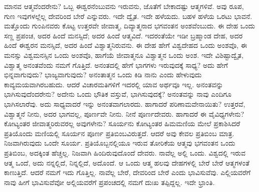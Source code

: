 ಮಾನವ ಆತ್ಮವೆಂದರೇನು? ಒಬ್ಬ ಈಶ್ವರನೆಂಬುವನು ಇರುವನು, ಜೊತೆಗೆ ಬೇಕಾದಷ್ಟು ಆತ್ಮಗಳಿವೆ. ಅವು ರೂಪ, ಗುಣ ಇವುಗಳಲ್ಲೆಲ್ಲ ದೇವರಿಂದ ಬೇರೆ ಎನ್ನುವರು. ಇದೇ ದ್ವೈತ. ಇದೇ ಹಳೆಯದು. ಬಹಳ ಹಳೆಯ ಒರಟು ಭಾವನೆ. ಮತ್ತೊಂದು ಗುಂಪಿನವರು ಕೊಟ್ಟ ಉತ್ತರವೇ ಜೀವಾತ್ಮ, ದಿವ್ಯಾತ್ಮನಾದ ಭಗವಂತನ ಅಂಶವೆಂಬುದು. ಈ ದೇಹ ಒಂದು ಸಣ್ಣ ಪ್ರಪಂಚ, ಅದರ ಹಿಂದೆ ಮನಸ್ಸಿದೆ; ಅದರ ಹಿಂದೆ ಆತ್ಮವಿದೆ. ಇದರಂತೆಯೇ ಇಡೀ ಬ್ರಹ್ಮಾಂಡ ದೇಹ, ಅದರ ಹಿಂದೆ ಈಶ್ವರನ ಮನಸ್ಸಿದೆ, ಅದರ ಹಿಂದೆ ವಿಶ್ವಾತ್ಮನಿರುವನು. ಈ ದೇಹ ಹೇಗೆ ವಿಶ್ವದೇಹದ ಒಂದು ಅಂಶವೊ, ಈ ಮನಸ್ಸು ವಿಶ್ವಮನಸ್ಸಿನ ಒಂದು ಅಂಶವೊ, ಹಾಗೆಯೆ ಜೀವಾತ್ಮನೂ ವಿಶ್ವಾತ್ಮನ ಒಂದು ಅಂಶ. ಇದೇ ವಿಶಿಷ್ಟಾದ್ವೈತ, ವಿಶ್ವಾತ್ಮ ಅನಂತವೆಂದು ನಮಗೆ ಗೊತ್ತಿದೆ. ಅನಂತದಲ್ಲಿ ಹೇಗೆ ಭಾಗಗಳು ಇರುವುದಕ್ಕೆ ಸಾಧ್ಯ? ಅದು ಹೇಗೆ ಭಿನ್ನವಾಗುವುದು? ಭಾಜ್ಯವಾಗುವುದು? ಅನಂತಾತ್ಮನ ಒಂದು ಕಿಡಿ ನಾನು ಎಂದು ಹೇಳುವುದು ಕಾವ್ಯಮಯವಾಗಿರಬಹುದು. ಆದರೆ ವಿಚಾರಮತಿಗಳಿಗೆ ಇದರಲ್ಲಿ ಯಾವ ಅರ್ಥವೂ ಇಲ್ಲ. ಅನಂತವನ್ನು ಭಾಗಿಸುವುದೆಂದರೇನು? ಅದೇನು ಒಂದು ಭೌತಿಕ ವಸ್ತುವೆ, ಭಾಗಿಸುವುದಕ್ಕೆ? ಅನಂತವನ್ನು ನಾವು ಎಂದಿಗೂ ಭಾಗಿಸಲಾರೆವು. ಅದು ಸಾಧ್ಯವಾದರೆ ಇನ್ನು ಅನಂತವಾಗಲಾರದು. ಹಾಗಾದರೆ ಪರಿಣಾಮವೇನಾಯಿತು? ಉತ್ತರವೆ, ವಿಶ್ವಾತ್ಮನೆ ನೀನು, ಅದರ ಭಾಗವಲ್ಲ, ಪೂರ್ಣವೇ ನೀನು. ನೀನೆ ಪೂರ್ಣದೇವರು. ಹಾಗಾದರೆ ಈ ವೈವಿಧ್ಯಗಳೇನು? ಕೋಟ್ಯಂತರ ಜೀವಾತ್ಮರಿರುವರಲ್ಲ ಅವುಗಳೇನು? ಸೂರ್ಯನು ಕೋಟ್ಯಂತರ ಹಿಮಮಣಿಯ ಮೇಲೆ ಪ್ರಕಾಶಿಸಿದರೆ ಪ್ರತಿಯೊಂದು ಮಣಿಯಲ್ಲಿ ಸೂರ್ಯನ ಪೂರ್ಣ ಪ್ರತಿಬಿಂಬವಿರುತ್ತದೆ. ಆದರೆ ಅವು ಕೇವಲ ಪ್ರತಿಬಿಂಬ ಮಾತ್ರ. ನಿಜವಾಗಿರುವುದು ಒಂದೇ ಸೂರ್ಯ. ಪ್ರತಿಯೊಬ್ಬನಲ್ಲಿಯೂ ಇರುವ ತೋರಿಕೆಯ ಆತ್ಮವು ಭಗವಂತನ ಒಂದು ಪ್ರತಿಬಿಂಬ, ಅದಕ್ಕಿಂತ ಹೆಚ್ಚಲ್ಲ. ನಿಜವಾಗಿ ಹಿಂದಿರುವುದೊಂದೆ ದೇವರು. ನಾವೆಲ್ಲ ಅಲ್ಲಿ ಒಂದು. ವಿಶ್ವದಲ್ಲಿ ಇರುವ ಆತ್ಮ ಒಂದೆ, ಅದು ನನ್ನಲ್ಲಿದೆ, ನಿನ್ನಲ್ಲಿದೆ, ಅದೊಂದೆ. ಆ ಒಂದು ಆತ್ಮ ಹಲವು ದೇಹಗಳಲ್ಲಿ ಬೇರೆ ಬೇರೆ ಆತ್ಮಗಳಂತೆ ಕಾಣುತ್ತಿದೆ. ಆದರೆ ನಮಗೆ ಇದು ಗೊತ್ತಿಲ್ಲ. ನಾವೆಲ್ಲ ಬೇರೆ, ದೇವರಿಂದ ಬೇರೆ ಎಂದು ಭಾವಿಸುವೆವು. ಎಲ್ಲಿಯವರೆಗೆ ನಾವು ಹೀಗೆ ಭಾವಿಸುವೆವೋ ಅಲ್ಲಿಯವರೆಗೆ ಪ್ರಪಂಚದಲ್ಲಿ ನಮಗೆ ದುಃಖ ತಪ್ಪಿದ್ದಲ್ಲ. ಇದೇ ಭ್ರಾಂತಿ.

